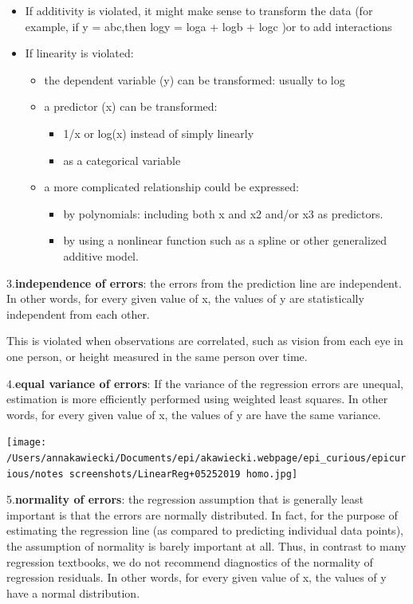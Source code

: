 \documentclass[
]{article}
\providecommand{\tightlist}{%
  \setlength{\itemsep}{0pt}\setlength{\parskip}{0pt}}
\begin{document}
\begin{itemize}
\item
  If additivity is violated, it might make sense to transform the data
  (for example, if y = abc,then logy = loga + logb + logc )or to add
  interactions
\item
  If linearity is violated:

  \begin{itemize}
  \tightlist
  \item
    the dependent variable (y) can be transformed: usually to log
  \item
    a predictor (x) can be transformed:

    \begin{itemize}
    \tightlist
    \item
      1/x or log(x) instead of simply linearly
    \item
      as a categorical variable
    \end{itemize}
  \item
    a more complicated relationship could be expressed:

    \begin{itemize}
    \tightlist
    \item
      by polynomials: including both x and x2 and/or x3 as predictors.
    \item
      by using a nonlinear function such as a spline or other
      generalized additive model.
    \end{itemize}
  \end{itemize}
\end{itemize}

3.\textbf{independence of errors}: the errors from the prediction line
are independent. In other words, for every given value of x, the values
of y are statistically independent from each other.

This is violated when observations are correlated, such as vision from
each eye in one person, or height measured in the same person over time.

4.\textbf{equal variance of errors}: If the variance of the regression
errors are unequal, estimation is more efficiently performed using
weighted least squares. In other words, for every given value of x, the
values of y are have the same variance.

\texttt{[image: /Users/annakawiecki/Documents/epi/akawiecki.webpage/epi\_curious/epicurious/notes screenshots/LinearReg+05252019 homo.jpg]}

5.\textbf{normality of errors}: the regression assumption that is
generally least important is that the errors are normally distributed.
In fact, for the purpose of estimating the regression line (as compared
to predicting individual data points), the assumption of normality is
barely important at all. Thus, in contrast to many regression textbooks,
we do not recommend diagnostics of the normality of regression
residuals. In other words, for every given value of x, the values of y
have a normal distribution.
\end{document}
